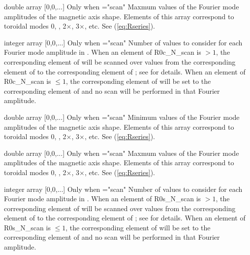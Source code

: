 \myhrule

{double array}
{[0,0,...]}
{Only when ={\ttfamily "scan"}}
{Maxmum values of the Fourier mode amplitudes of the magnetic axis shape. Elements of this array correspond to toroidal modes 0, , 2$\times$, 3$\times$, etc.  See (\ref{eq:Rseries}).
}

\myhrule

{integer array}
{[0,0,...]}
{Only when ={\ttfamily "scan"}}
{Number of values to consider for each Fourier mode amplitude in . When an element of {\ttfamily R0c\_N\_scan} is $>1$, the corresponding element of  will be scanned over  values from the corresponding element of  to the corresponding element of ; see  for details.  When an element of {\ttfamily R0c\_N\_scan} is $\le 1$, the corresponding element of  will be set to the corresponding element of  and no scan will be performed in that Fourier amplitude.
}

\myhrule

{double array}
{[0,0,...]}
{Only when ={\ttfamily "scan"}}
{Minimum values of the Fourier mode amplitudes of the magnetic axis shape. Elements of this array correspond to toroidal modes 0, , 2$\times$, 3$\times$, etc.  See (\ref{eq:Rseries}).
}

\myhrule

{double array}
{[0,0,...]}
{Only when ={\ttfamily "scan"}}
{Maxmum values of the Fourier mode amplitudes of the magnetic axis shape. Elements of this array correspond to toroidal modes 0, , 2$\times$, 3$\times$, etc.  See (\ref{eq:Rseries}).
}

\myhrule

{integer array}
{[0,0,...]}
{Only when ={\ttfamily "scan"}}
{Number of values to consider for each Fourier mode amplitude in . When an element of {\ttfamily R0s\_N\_scan} is $>1$, the corresponding element of  will be scanned over  values from the corresponding element of  to the corresponding element of ; see  for details.  When an element of {\ttfamily R0s\_N\_scan} is $\le 1$, the corresponding element of  will be set to the corresponding element of  and no scan will be performed in that Fourier amplitude.
}

